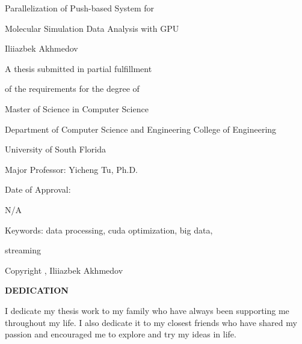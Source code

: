 \documentclass[12pt,letterpaper]{report}
\makeatletter
\newcommand\frontmatter{%
    \cleardoublepage
  \pagenumbering{roman}}
\makeatother
\begin{document}
{
\frontmatter

\thispagestyle{empty}

\linespread{1}\selectfont
\centering
\vspace*{5\baselineskip}
Parallelization of Push-based System for 

\vspace*{1\baselineskip}

Molecular Simulation Data Analysis with GPU 
\vspace*{3\baselineskip}

\vspace*{3\baselineskip}

{ Iliiazbek Akhmedov }

\vspace*{5\baselineskip}

A thesis submitted in partial fulfillment 

of the requirements for the degree of 

Master of Science in Computer Science 

Department of Computer Science and Engineering College of Engineering 

University of South Florida

\vspace*{3\baselineskip}
Major Professor:  Yicheng Tu, Ph.D.

\vspace*{2\baselineskip}
\vspace{.5cm}
Date of Approval:

N/A

\vspace*{3\baselineskip}
Keywords: data processing, cuda optimization, big data,

streaming

\vspace*{1\baselineskip}
Copyright \textcopyright{}, Iliiazbek Akhmedov

}

\clearpage
\pagestyle{plain}
\centering

\vspace*{5\baselineskip}
\linespread{2}\selectfont
\textbf{DEDICATION}

\vspace*{1\baselineskip}

\begin{flushleft}
\hspace{3em} I dedicate my thesis work to my family who have always been supporting me throughout my life. I also dedicate it to my closest friends who have shared my passion and encouraged me to explore and try my ideas in life.
\end{flushleft}
\end{document}
